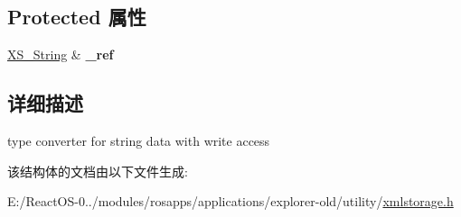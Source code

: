 \subsection*{Protected 属性}
\begin{DoxyCompactItemize}
\item 
\mbox{\label{struct_x_m_l_storage_1_1_x_m_l_string_ref_a85bcef05700c4a15308c4703c076229b}} 
\hyperlink{struct_x_m_l_storage_1_1_x_s___string}{X\+S\+\_\+\+String} \& {\bfseries \+\_\+ref}
\end{DoxyCompactItemize}


\subsection{详细描述}
type converter for string data with write access 

该结构体的文档由以下文件生成\+:\begin{DoxyCompactItemize}
\item 
E\+:/\+React\+O\+S-\/0../modules/rosapps/applications/explorer-\/old/utility/\hyperlink{xmlstorage_8h}{xmlstorage.\+h}\end{DoxyCompactItemize}
